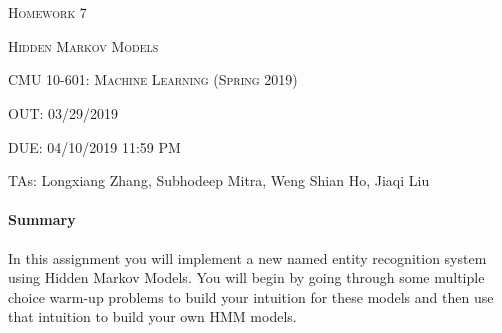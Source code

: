 \documentclass{article}
\begin{document}
\section*{}
\begin{center}
  \centerline{\textsc{\LARGE Homework 7}}
  \vspace{0.5em}
  \centerline{\textsc{\LARGE Hidden Markov Models}}
  \vspace{1em}
  \textsc{\large CMU 10-601: Machine Learning (Spring 2019)} \\
  \url{}
  \centerline{OUT: 03/29/2019}
  \centerline{DUE: 04/10/2019 11:59 PM}
    \centerline{TAs: Longxiang Zhang, Subhodeep Mitra, Weng Shian Ho, Jiaqi Liu}
\end{center}


\begin{notebox}
\paragraph{Summary} In this assignment you will implement a new named entity recognition system using Hidden Markov Models. You will begin by going through some multiple choice warm-up problems to build your intuition for these models and then use that intuition to build your own HMM models.
\end{notebox}
\end{document}
